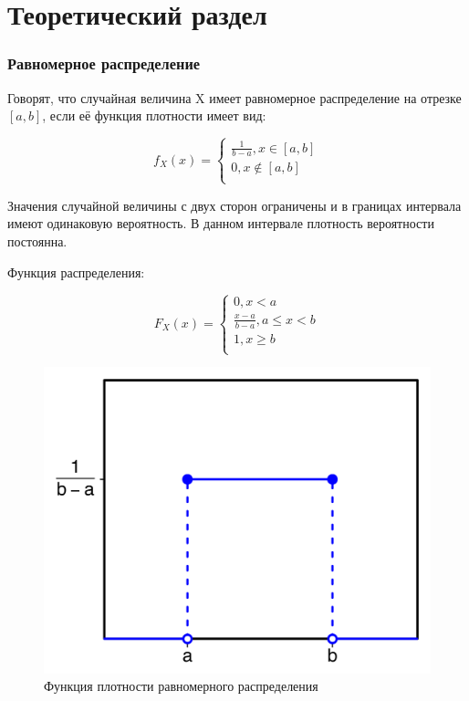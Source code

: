\chapter{Теоретический раздел}

\subsection{Равномерное распределение}
    
Говорят, что случайная величина X имеет равномерное распределение на отрезке $[a,b]$, если её функция плотности имеет вид:

\begin{equation*}
    f_X (x) =
    \begin{cases}
        \frac{1}{b-a}, x \in [a,b] \\
        0, x \notin [a, b] \\
    \end{cases}
\end{equation*}

Значения случайной величины с двух сторон ограничены и в границах интервала имеют одинаковую вероятность. В данном интервале плотность вероятности постоянна.

Функция распределения:

\begin{equation*}
F_X (x) =
    \begin{cases}
        0, x < a \\
        \frac{x - a}{b - a}, a \le x < b \\
        1, x \geq b \\
    \end{cases}
\end{equation*}

\begin{figure}[H]
    \begin{center}
    \includegraphics[width=0.5\linewidth]{inc/uni_f.png}
    \caption{Функция плотности равномерного распределения}
    \label{fig:}
    \end{center}
\end{figure}

